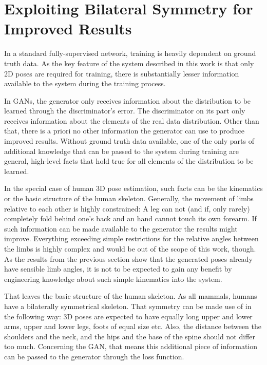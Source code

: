 \section{
	Exploiting Bilateral Symmetry for Improved Results}


In a standard fully-supervised network, training is heavily dependent on ground truth data.
As the key feature of the system described in this work is that only 2D poses are required for training, there is substantially lesser information available to the system during the training process.

In GANs, the generator only receives information about the distribution to be learned through the discriminator's error.
The discriminator on its part only receives information about the elements of the real data distribution.
Other than that, there is a priori no other information the generator can use to produce improved results.
Without ground truth data available, one of the only parts of additional knowledge that can be passed to the system during training are general, high-level facts that hold true for all elements of the distribution to be learned.

In the special case of human 3D pose estimation, such facts can be the kinematics or the basic structure of the human skeleton.
Generally, the movement of limbs relative to each other is highly constrained:
A leg can not (and if, only rarely) completely fold behind one's back and an hand cannot touch its own forearm.
If such information can be made available to the generator the results might improve.
Everything exceeding simple restrictions for the relative angles between the limbs is highly complex and would be out of the scope of this work, though.
As the results from the previous section show that the generated poses already have sensible limb angles, it is not to be expected to gain any benefit by engineering knowledge about such simple kinematics into the system.

That leaves the basic structure of the human skeleton.
As all mammals, humans have a bilaterally symmetrical skeleton.
That symmetry can be made use of in the following way:
3D poses are expected to have equally long upper and lower arms, upper and lower legs, foots of equal size etc.
Also, the distance between the shoulders and the neck, and the hips and the base of the spine should not differ too much.
Concerning the GAN, that means this additional piece of information can be passed to the generator through the loss function.

